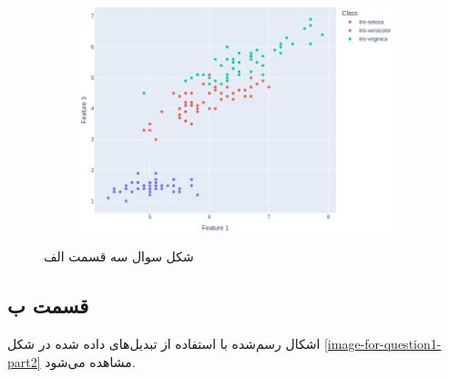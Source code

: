 \documentclass[14pt,a4]{article}
\begin{document}
\begin{figure}[h]
\begin{subfigure}{0.32\linewidth}
        \includegraphics[width=\linewidth]{images/q3/p1/13.png}
    \end{subfigure}
    \caption{شکل سوال سه قسمت الف}
    \label{image-for-question1-part1}
\end{figure}

\subsection*{قسمت ب}

اشکال رسم‌شده با استفاده از تبدیل‌های داده شده در شکل \ref{image-for-question1-part2} مشاهده می‌شود.
\end{document}
